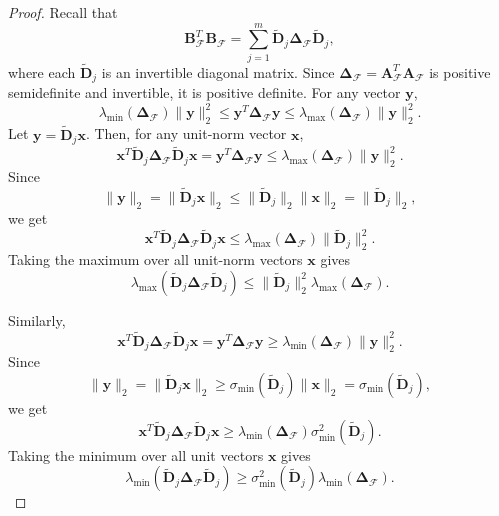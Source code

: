 \documentclass[journal,draftcls,onecolumn]{IEEEtran}
\theoremstyle{mystyle}
\begin{document}
\begin{proof}
Recall that
\[
\mathbf{B}_{\mathcal F}^{T}\mathbf{B}_{\mathcal F}
=
\sum_{j=1}^{m}
\tilde{\mathbf{D}}_j
\mathbf{\Delta}_{\mathcal F}
\tilde{\mathbf{D}}_j,
\]
where each $\tilde{\mathbf{D}}_j$ is an invertible diagonal matrix. Since $\mathbf{\Delta}_{\mathcal{F}}=\mathbf{A}_{\mathcal{F}}^T\mathbf{A}_{\mathcal{F}}$ is positive semidefinite and invertible, it is positive definite. For any vector $\mathbf{y}$,
\[
\lambda_{\min}(\mathbf{\Delta}_{\mathcal F})\|\mathbf{y}\|_2^2
\le
\mathbf{y}^{T}\mathbf{\Delta}_{\mathcal F}\mathbf{y}
\le
\lambda_{\max}(\mathbf{\Delta}_{\mathcal F})\|\mathbf{y}\|_2^2.
\]
Let $\mathbf{y}= \tilde{\mathbf{D}}_j\mathbf{x}$. Then, for any unit-norm vector $\mathbf{x}$,
\[
\mathbf{x}^{T}
\tilde{\mathbf{D}}_j
\mathbf{\Delta}_{\mathcal F}
\tilde{\mathbf{D}}_j
\mathbf{x}
=
\mathbf{y}^{T}{\mathbf{\Delta}}_{\mathcal F}\mathbf{y}
\le
\lambda_{\max}({\mathbf{\Delta}}_{\mathcal F})
\|\mathbf{y}\|_2^2.
\]
Since
\[
\|\mathbf{y}\|_2
=
\|\tilde{\mathbf{D}}_j\mathbf{x}\|_2
\le
\|\tilde{\mathbf{D}}_j\|_2\|\mathbf{x}\|_2
=
\|\tilde{\mathbf{D}}_j\|_2,
\]
we get
\[
\mathbf{x}^{T}
\tilde{\mathbf{D}}_j
\mathbf{\Delta}_{\mathcal F}
\tilde{\mathbf{D}}_j
\mathbf{x}
\le
\lambda_{\max}(\mathbf{\Delta}_{\mathcal F})
\|\tilde{\mathbf{D}}_j\|_2^2.
\]
Taking the maximum over all unit-norm vectors $\mathbf{x}$ gives
\[
\lambda_{\max}
\!\left(
\tilde{\mathbf{D}}_j
\mathbf{\Delta}_{\mathcal F}
\tilde{\mathbf{D}}_j
\right)
\le
\|\tilde{\mathbf{D}}_j\|_2^2
\lambda_{\max}(\mathbf{\Delta}_{\mathcal F}).
\]

Similarly,
\[
\mathbf{x}^{T}
\tilde{\mathbf{D}}_j
\mathbf{\Delta}_{\mathcal F}
\tilde{\mathbf{D}}_j
\mathbf{x}
=
\mathbf{y}^{T}\mathbf{\Delta}_{\mathcal F}\mathbf{y}
\ge
\lambda_{\min}(\mathbf{\Delta}_{\mathcal F})
\|\mathbf{y}\|_2^2.
\]
Since
\[
\|\mathbf{y}\|_2
=
\|\tilde{\mathbf{D}}_j\mathbf{x}\|_2
\ge
\sigma_{\min}(\tilde{\mathbf{D}}_j)\|\mathbf{x}\|_2
=
\sigma_{\min}(\tilde{\mathbf{D}}_j),
\]
we get
\[
\mathbf{x}^{T}
\tilde{\mathbf{D}}_j
\mathbf{\Delta}_{\mathcal F}
\tilde{\mathbf{D}}_j
\mathbf{x}
\ge
\lambda_{\min}({\mathbf{\Delta}}_{\mathcal F})
\sigma_{\min}^2(\tilde{\mathbf{D}}_j).
\]
Taking the minimum over all unit vectors $\mathbf{x}$ gives
\[
\lambda_{\min}
\!\left(
\tilde{\mathbf{D}}_j
\mathbf{\Delta}_{\mathcal F}
\tilde{\mathbf{D}}_j
\right)
\ge
\sigma_{\min}^2(\tilde{\mathbf{D}}_j)
\lambda_{\min}(\mathbf{\Delta}_{\mathcal F}).
\]


\end{proof}
\end{document}
